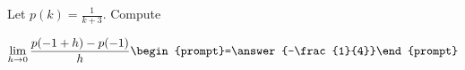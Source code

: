 \documentclass{ximera}
\author{Bart Snapp}
\begin{document}
\begin{exercise}
Let $p(k) = \frac{1}{k+3}$. Compute

\[
\lim_{ h\to 0 } \frac{p(-1+h)-p(-1)}{h} \begin{prompt}=\answer{-\frac{1}{4}}\end{prompt}
\]
\end{exercise}
\end{document}
